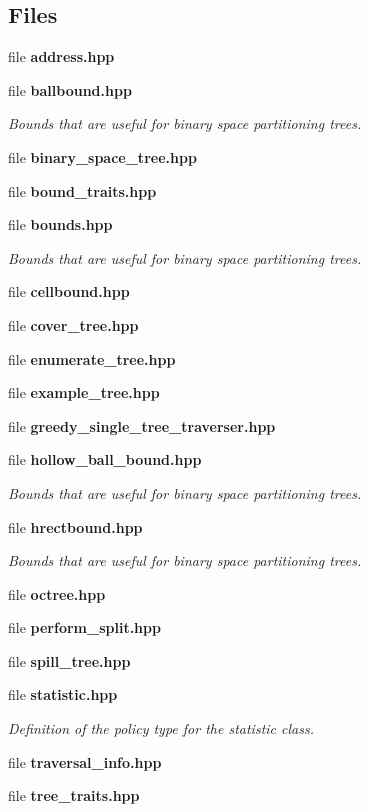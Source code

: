 \subsection*{Files}
\begin{DoxyCompactItemize}
\item 
file \textbf{ address.\+hpp}
\item 
file \textbf{ ballbound.\+hpp}
\begin{DoxyCompactList}\small\item\em Bounds that are useful for binary space partitioning trees. \end{DoxyCompactList}\item 
file \textbf{ binary\+\_\+space\+\_\+tree.\+hpp}
\item 
file \textbf{ bound\+\_\+traits.\+hpp}
\item 
file \textbf{ bounds.\+hpp}
\begin{DoxyCompactList}\small\item\em Bounds that are useful for binary space partitioning trees. \end{DoxyCompactList}\item 
file \textbf{ cellbound.\+hpp}
\item 
file \textbf{ cover\+\_\+tree.\+hpp}
\item 
file \textbf{ enumerate\+\_\+tree.\+hpp}
\item 
file \textbf{ example\+\_\+tree.\+hpp}
\item 
file \textbf{ greedy\+\_\+single\+\_\+tree\+\_\+traverser.\+hpp}
\item 
file \textbf{ hollow\+\_\+ball\+\_\+bound.\+hpp}
\begin{DoxyCompactList}\small\item\em Bounds that are useful for binary space partitioning trees. \end{DoxyCompactList}\item 
file \textbf{ hrectbound.\+hpp}
\begin{DoxyCompactList}\small\item\em Bounds that are useful for binary space partitioning trees. \end{DoxyCompactList}\item 
file \textbf{ octree.\+hpp}
\item 
file \textbf{ perform\+\_\+split.\+hpp}
\item 
file \textbf{ spill\+\_\+tree.\+hpp}
\item 
file \textbf{ statistic.\+hpp}
\begin{DoxyCompactList}\small\item\em Definition of the policy type for the statistic class. \end{DoxyCompactList}\item 
file \textbf{ traversal\+\_\+info.\+hpp}
\item 
file \textbf{ tree\+\_\+traits.\+hpp}
\end{DoxyCompactItemize}
